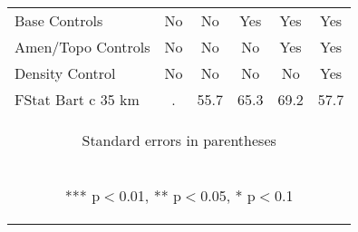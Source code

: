 \begin{tabular}{lccccc}
Base Controls & No & No & Yes & Yes & Yes \\
Amen/Topo Controls & No & No & No & Yes & Yes \\
Density Control & No & No & No & No & Yes \\
 FStat Bart c 35 km & . & 55.7 & 65.3 & 69.2 & 57.7 \\ \hline
\multicolumn{6}{c}{\begin{footnotesize} Standard errors in parentheses\end{footnotesize}} \\
\multicolumn{6}{c}{\begin{footnotesize} *** p$<$0.01, ** p$<$0.05, * p$<$0.1\end{footnotesize}} \\
\end{tabular}

